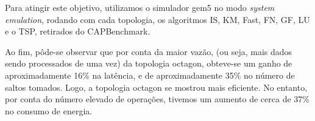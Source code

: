 \documentclass[12pt]{article}
\begin{document}
 Para atingir este objetivo, utilizamos o simulador gem5 no modo \textit{system emulation}, rodando com cada topologia, os algoritmos IS, KM, Fast, FN, GF, LU e o TSP, retirados do CAPBenchmark.
 
 Ao fim, pôde-se observar que por conta da maior vazão, (ou seja, mais dados sendo processados de uma vez) da topologia octagon, obteve-se um ganho de aproximadamente 16\% na latência, e de aproximadamente 35\% no número de saltos tomados. Logo, a topologia octagon se mostrou mais eficiente. No entanto, por conta do número elevado de operações, tivemos um aumento de cerca de 37\% no consumo de energia.



\end{document}
